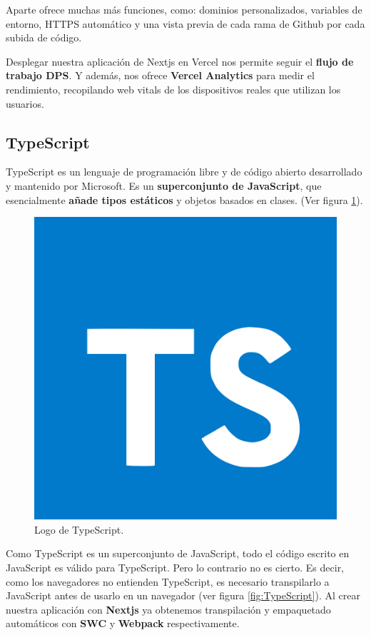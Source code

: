 \documentclass[12pt,twoside,titlepage]{report}
\begin{document}
Aparte ofrece muchas más funciones, como: dominios personalizados, variables de entorno, HTTPS automático y una vista previa de cada rama de Github por cada subida de código.

Desplegar nuestra aplicación de Nextjs en Vercel nos permite seguir el \textbf{flujo de trabajo DPS}. Y además, nos ofrece \textbf{Vercel Analytics} para medir el rendimiento, recopilando web vitals de los dispositivos reales que utilizan los usuarios.

\subsection{TypeScript}

TypeScript es un lenguaje de programación libre y de código abierto desarrollado y mantenido por Microsoft. Es un \textbf{superconjunto de JavaScript}, que esencialmente \textbf{añade tipos estáticos} y objetos basados en clases.
(Ver figura \ref{fig:TypeScriptLogo}).

\begin{figure}[H]
    \centering
    \includegraphics[scale=0.03]{TypeScript/TypeScript}
    \caption{Logo de TypeScript.}
    \label{fig:TypeScriptLogo}
\end{figure}

Como TypeScript es un superconjunto de JavaScript, todo el código escrito en JavaScript es válido para TypeScript. Pero lo contrario no es cierto. Es decir, como los navegadores no entienden TypeScript, es necesario transpilarlo a JavaScript antes de usarlo en un navegador (ver figura \ref{fig:TypeScript}). Al crear nuestra aplicación con \textbf{Nextjs} ya obtenemos transpilación y empaquetado automáticos con \textbf{SWC} y \textbf{Webpack} respectivamente.
\end{document}
